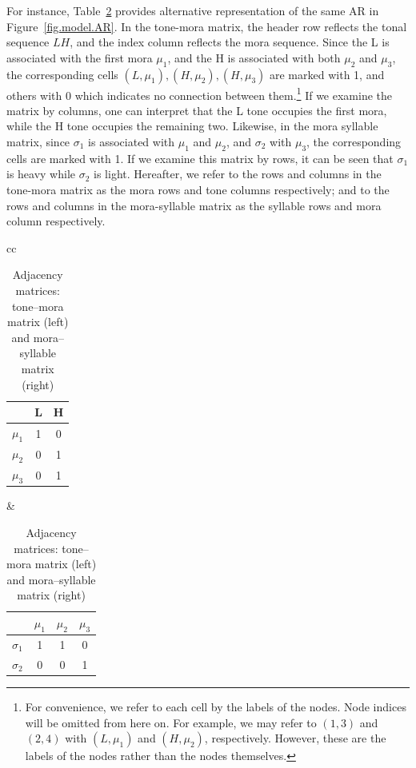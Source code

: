 \documentclass{CUP-JNL-PHO}%
\theoremstyle{definition}
\numberwithin{equation}{section}
\theoremstyle{definition}
\begin{document}
For instance, Table~\ref{tab.matrices} provides alternative
representation of the same AR in Figure~\ref{fig.model.AR}.
In the tone-mora matrix, the header row reflects the tonal sequence
$LH$, and the index column reflects the mora sequence. Since the L is
associated with the first mora $\mu_1$, and the H is associated with
both $\mu_2$ and $\mu_3$, the corresponding cells
$(L, \mu_1), (H, \mu_2), (H, \mu_3)$ are marked with 1, and others
with 0 which indicates no connection between them.\footnote{For
	convenience, we refer to each cell by the labels of the nodes. Node
	indices will be omitted from here on. For example, we may refer to $(1,3)$
	and $(2,4)$ with $(L,\mu_1)$ and $(H, \mu_2)$, respectively. However, 
	these are the labels of the nodes rather than the nodes 
	themselves.}  If we examine the matrix by columns, one can interpret that
the L tone occupies the first mora, while the H tone occupies the
remaining two.  Likewise, in the mora syllable matrix, since
$\sigma_1$ is associated with $\mu_1$ and $\mu_2$, and $\sigma_2$ with
$\mu_3$, the corresponding cells are marked with 1. If we examine this
matrix by rows, it can be seen that $\sigma_1$ is heavy while
$\sigma_2$ is light. Hereafter, we refer to the rows and columns in
the tone-mora matrix as the mora rows and tone columns respectively;
and to the rows and columns in the mora-syllable matrix as the
syllable rows and mora column respectively.
\begin{table}[ht]
\centering 
	\begin{tabular}{cc}
	\centering
	\begin{tabular}{c|cc}
			& L & H \\
			\hline
			$\mu_1$ & 1 & 0 \\
			$\mu_2$ & 0 & 1 \\
			$\mu_3$ & 0 & 1 \\
	\end{tabular} \vspace{1em}
		&
	\begin{tabular}{c|ccc}
			& $\mu_1$ & $\mu_2$ & $\mu_3$ \\ \hline
			$\sigma_1$ & 1     & 1     & 0     \\
			$\sigma_2$ & 0     & 0     & 1
	\end{tabular}
	\end{tabular}
	\caption{Adjacency matrices: tone–mora matrix (left) and mora–syllable matrix (right)}
	
	\label{tab.matrices}
\end{table}
\end{document}
